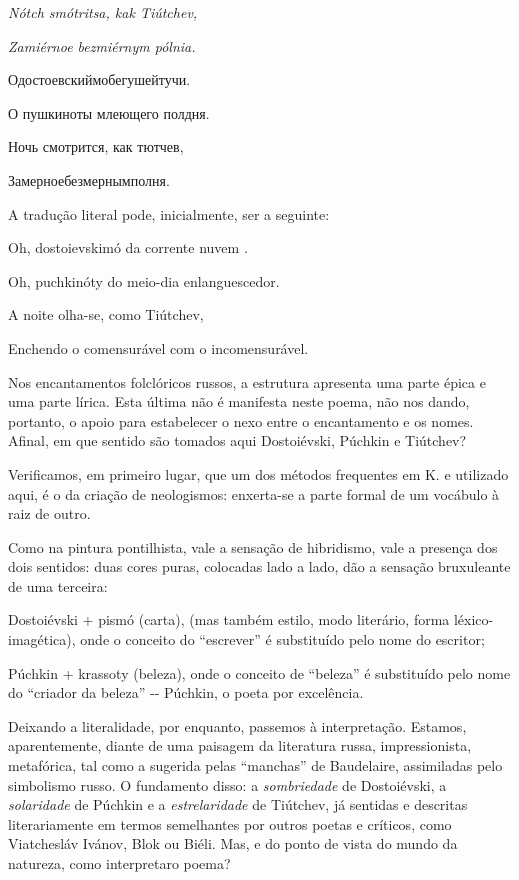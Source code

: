 \emph{Nótch smótritsa, kak Tiútchev,}

\emph{Zamiérnoe bezmiérnym pólnia.}

Одостоевскиймобегушейтучи.

О пушкиноты млеющего полдня.

Ночь смотрится, как тютчев,

Замерноебезмернымполня.

A tradução literal pode, inicialmente, ser a seguinte:

Oh, dostoievskimó da corrente nuvem .

Oh, puchkinóty do meio-dia enlanguescedor.

A noite olha-se, como Tiútchev,

Enchendo o comensurável com o incomensurável.

Nos encantamentos folclóricos russos, a estrutura apresenta uma parte
épica e uma parte lírica. Esta última não é manifesta neste poema, não
nos dando, portanto, o apoio para estabelecer o nexo entre o
encantamento e os nomes. Afinal, em que sentido são tomados aqui
Dostoiévski, Púchkin e Tiútchev?

Verificamos, em primeiro lugar, que um dos métodos frequentes em K. e
utilizado aqui, é o da criação de neologismos: enxerta-se a parte formal
de um vocábulo à raiz de outro.

Como na pintura pontilhista, vale a sensação de hibridismo, vale a
presença dos dois sentidos: duas cores puras, colocadas lado a lado, dão
a sensação bruxuleante de uma terceira:

Dostoiévski + pismó (carta), (mas também estilo, modo literário, forma
léxico-imagética), onde o conceito do ``escrever'' é substituído pelo
nome do escritor;

Púchkin + krassoty (beleza), onde o conceito de ``beleza'' é substituído
pelo nome do ``criador da beleza'' -\/- Púchkin, o poeta por excelência.

Deixando a literalidade, por enquanto, passemos à interpretação.
Estamos, aparentemente, diante de uma paisagem da literatura russa,
impressionista, metafórica, tal como a sugerida pelas ``manchas'' de
Baudelaire, assimiladas pelo simbolismo russo. O fundamento disso: a
\emph{sombriedade} de Dostoiévski, a \emph{solaridade} de Púchkin e a
\emph{estrelaridade} de Tiútchev, já sentidas e descritas literariamente
em termos semelhantes por outros poetas e críticos, como Viatchesláv
Ivánov, Blok ou Biéli. Mas, e do ponto de vista do mundo da natureza,
como interpretaro poema?


